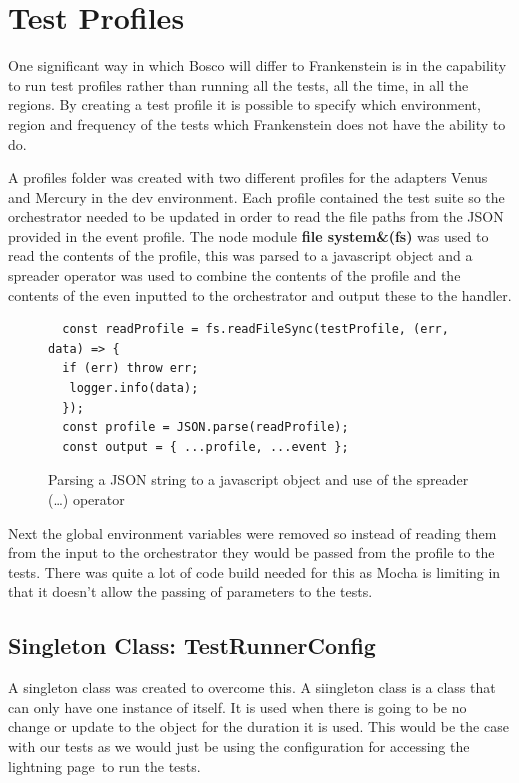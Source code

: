 \documentclass[12pt,a4paper,titlepage]{report}
\begin{document}
\section{Test Profiles}
One significant way in which Bosco will differ to Frankenstein is in the capability to run test profiles rather than 
running all the tests, all the time, in all the regions. By creating a test profile it is possible to specify which 
environment, region and frequency of the tests which Frankenstein does not have the ability to do. 

A profiles folder was created with two different profiles for the adapters Venus and Mercury in the dev environment. Each profile 
contained the test suite so the orchestrator needed to be updated in order to read the file paths from the JSON provided in the 
event profile. The node module \textbf{file system\&(fs)} was used to read the contents of the profile, this was parsed to 
a javascript object and a spreader operator was used to combine the contents of the profile and the contents of 
the even inputted to the orchestrator and output these to the handler.

\begin{figure}[H]
 \begin{tcolorbox}
  \begin{verbatim}
  const readProfile = fs.readFileSync(testProfile, (err, data) => {
  if (err) throw err;
   logger.info(data);
  });
  const profile = JSON.parse(readProfile);
  const output = { ...profile, ...event };
  \end{verbatim}
 \end{tcolorbox}
 \caption{Parsing a JSON string to a javascript object and use of the spreader (\dots) operator}
\end{figure}

Next the global environment variables were removed so instead of reading them from the input to the orchestrator they would 
be passed from the profile to the tests. There was quite a lot of code build needed for this as Mocha is limiting in that it doesn't 
allow the passing of parameters to the tests. 

\subsection{Singleton Class: TestRunnerConfig}
A singleton class was created to overcome this. A siingleton class is a class that can only have one instance of 
itself. It is used when there is going to be no change or update to the object for the duration it is used. This would be the case with our tests as we would just be using the configuration for accessing the lightning page to run the tests.
\end{document}
